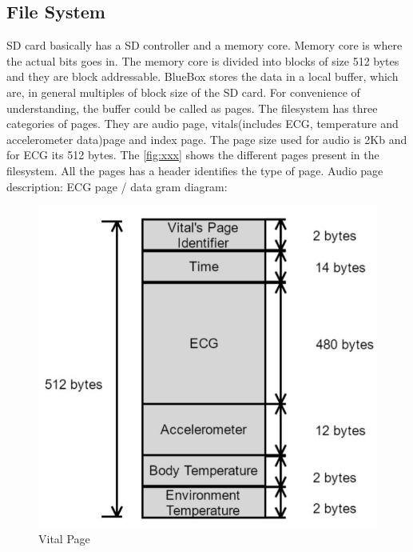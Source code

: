 \subsection{File System}
SD card basically has a SD controller and a memory core. Memory core is where the actual bits goes in. The memory core is divided into blocks of size 512 bytes and they are block addressable.  BlueBox stores the data in a local buffer, which  are, in general multiples of block size of the SD card. For convenience of understanding, the buffer could be called as pages. The filesystem has three categories of pages. They are audio page, vitals(includes ECG, temperature and accelerometer data)page and index page. The page size used for audio is 2Kb and for ECG its 512 bytes. The \ref{fig:xxx} shows the different pages present in the filesystem. All the pages has a header identifies the type of page.  
Audio page description: 
ECG page / data gram diagram: 
\begin{figure}[h]
	\centering
	\includegraphics[scale = 0.5 ]{vital_page.JPG}
	\caption{Vital Page\label{vital_page}}
\end{figure}

